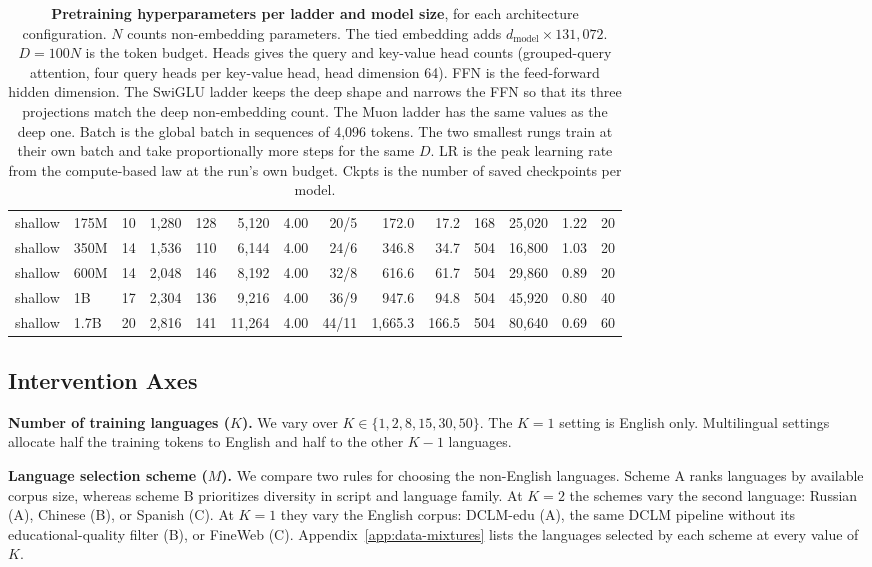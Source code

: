 \begin{table}[t]
{\begin{tabular}{llrrrrrrrrrrrr}
shallow & 175M & 10 & 1,280 & 128 & 5,120 & 4.00 & 20/5 & 172.0 & 17.2 & 168 & 25,020 & 1.22 & 20 \\
shallow & 350M & 14 & 1,536 & 110 & 6,144 & 4.00 & 24/6 & 346.8 & 34.7 & 504 & 16,800 & 1.03 & 20 \\
shallow & 600M & 14 & 2,048 & 146 & 8,192 & 4.00 & 32/8 & 616.6 & 61.7 & 504 & 29,860 & 0.89 & 20 \\
shallow & 1B & 17 & 2,304 & 136 & 9,216 & 4.00 & 36/9 & 947.6 & 94.8 & 504 & 45,920 & 0.80 & 40 \\
shallow & 1.7B & 20 & 2,816 & 141 & 11,264 & 4.00 & 44/11 & 1,665.3 & 166.5 & 504 & 80,640 & 0.69 & 60 \\
\bottomrule
\end{tabular}}
\caption{\textbf{Pretraining hyperparameters per ladder and model size}, for each architecture configuration. $N$ counts non-embedding parameters. The tied embedding adds $d_{\mathrm{model}} \times 131{,}072$. $D = 100N$ is the token budget. Heads gives the query and key-value head counts (grouped-query attention, four query heads per key-value head, head dimension 64). FFN is the feed-forward hidden dimension. The SwiGLU ladder keeps the deep shape and narrows the FFN so that its three projections match the deep non-embedding count. The Muon ladder has the same values as the deep one. Batch is the global batch in sequences of 4,096 tokens. The two smallest rungs train at their own batch and take proportionally more steps for the same $D$. LR is the peak learning rate from the compute-based law at the run's own budget. Ckpts is the number of saved checkpoints per model.}
\label{tab:ladder}
\end{table}

\subsection{Intervention Axes}
\label{app:intervention-axes}

\textbf{Number of training languages ($K$).} We vary over $K \in \{1, 2, 8, 15, 30, 50\}$. The $K=1$ setting is English only. Multilingual settings allocate half the training tokens to English and half to the other $K-1$ languages.

\textbf{Language selection scheme ($M$).}
We compare two rules for choosing the non-English languages. Scheme A ranks languages by available corpus size, whereas scheme B prioritizes diversity in script and language family.
At $K=2$ the schemes vary the second language: Russian (A), Chinese (B), or Spanish (C). At $K=1$ they vary the English corpus: DCLM-edu (A), the same DCLM pipeline without its educational-quality filter (B), or FineWeb (C).
Appendix~\ref{app:data-mixtures} lists the languages selected by each scheme at every value of $K$.


